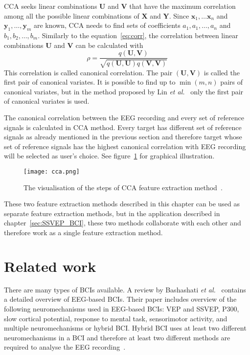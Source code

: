 \gls{CCA} seeks \glspl{linear combination} $\mathbf{U}$ and $\mathbf{V}$ that have the maximum \gls{correlation} among all the possible \glspl{linear combination} of $\mathbf{X}$ and $\mathbf{Y}$. Since $\mathbf{x}_1,\dots\mathbf{x}_n$ and $\mathbf{y}_1,\dots,\mathbf{y}_m$ are known, \gls{CCA}  needs to find sets of coefficients $a_1, a_1, \dots, a_n$ and $b_1, b_2, \dots, b_m$. Similarly to the equation~\ref{eq:corr}, the \gls{correlation} between \glspl{linear combination} $\mathbf{U}$ and $\mathbf{V}$ can be calculated with
\begin{equation}
	\rho = \frac{q(\mathbf{U}, \mathbf{V})}{\sqrt{q(\mathbf{U},\mathbf{U})q(\mathbf{V},\mathbf{V})}}
\end{equation}
This \gls{correlation} is called \gls{canonical correlation}. The pair $(\mathbf{U}, \mathbf{V})$ is called the first pair of canonical variates. It is possible to find up to $\min(m, n)$ pairs of canonical variates, but in the method proposed by Lin \textit{et al.}~\cite{cca_lin} only the first pair of canonical variates is used.

The \gls{canonical correlation} between the \gls{EEG} recording and every set of \glspl{reference signal} is calculated in \gls{CCA} method. Every \gls{target} has different set of \glspl{reference signal} as already mentioned in the previous section and therefore \gls{target} whose set of \glspl{reference signal} has the highest \gls{canonical correlation} with \gls{EEG} recording will be selected as user's choice. See figure~\ref{fig:cca} for graphical illustration.

\begin{figure}[h]
	\centering
	\texttt{[image: cca.png]}
	\caption{The visualisation of the steps of CCA feature extraction method~\cite{bin2009cca}.}
	\label{fig:cca}
\end{figure}

These two \gls{feature extraction} methods described in this chapter can be used as separate \gls{feature extraction} methods, but in the application described in chapter~\ref{sec:SSVEP_BCI}, these two methods collaborate with each other and therefore work as a single \gls{feature extraction} method.

\section{Related work}

There are many types of \glspl{BCI} available. A review by Bashashati \textit{et al.}~\cite{bci_comparison} contains a detailed overview of \gls{EEG}-based \glspl{BCI}. Their paper includes overview of the following neuromechanisms used in \gls{EEG}-based \glspl{BCI}: \gls{VEP} and \gls{SSVEP}, P300, slow cortical potential, response to mental task, sensorimotor activity, and multiple neuromechanisms or hybrid \gls{BCI}. Hybrid \gls{BCI} uses at least two different neuromechanisms in a \gls{BCI} and therefore at least two different methods are required to analyse the \gls{EEG} recording~\cite{hybrid_bci, hybrid_bci2}.

